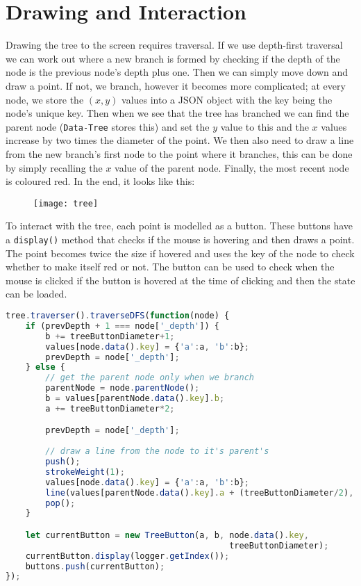 \section{Drawing and Interaction}
Drawing the tree to the screen requires traversal. If we use depth-first
traversal we can work out where a new branch is formed by checking if the depth
of the node is the previous node's depth plus one. Then we can simply move down
and draw a point. If not, we branch, however it becomes more complicated; at
every node, we store the $(x,y)$ values into a JSON object with the key being the
node's unique key. Then when we see that the tree has branched we can find the
parent node (\verb|Data-Tree| stores this) and set the $y$ value to this and the
$x$ values increase by two times the diameter of the point. We then also need
to draw a line from the new branch's first node to the point where it branches,
this can be done by simply recalling the $x$ value of the parent node. Finally,
the most recent node is coloured red. In the end, it looks like this:

\begin{figure}[H]
    \centering
    \texttt{[image: tree]}
    \caption{}
\end{figure}

To interact with the tree, each point is modelled as a button. These buttons
have a \verb|display()| method that checks if the mouse is hovering and then
draws a point. The point becomes twice the size if hovered and uses the key of
the node to check whether to make itself red or not. The button can be used to
check when the mouse is clicked if the button is hovered at the time of clicking
and then the state can be loaded.

\begin{lstlisting}[language=JavaScript]
tree.traverser().traverseDFS(function(node) {
    if (prevDepth + 1 === node['_depth']) {
        b += treeButtonDiameter+1;
        values[node.data().key] = {'a':a, 'b':b};
        prevDepth = node['_depth'];
    } else {
        // get the parent node only when we branch
        parentNode = node.parentNode();
        b = values[parentNode.data().key].b;
        a += treeButtonDiameter*2;

        prevDepth = node['_depth'];
        
        // draw a line from the node to it's parent's
        push();
        strokeWeight(1);
        values[node.data().key] = {'a':a, 'b':b};
        line(values[parentNode.data().key].a + (treeButtonDiameter/2), b, a,b);
        pop();
    }

    let currentButton = new TreeButton(a, b, node.data().key, 
                                             treeButtonDiameter);
    currentButton.display(logger.getIndex());
    buttons.push(currentButton);
});
\end{lstlisting}

